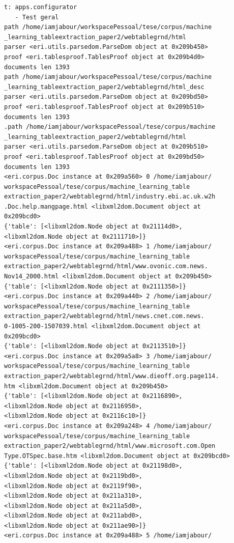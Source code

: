 \documentclass[12pt, a4paper]{article}
\begin{document}
\begin{enumerate}
\begin{verbatim}
t: apps.configurator
   - Test geral
path /home/iamjabour/workspacePessoal/tese/corpus/machine
_learning_tableextraction_paper2/webtablegrnd/html
parser <eri.utils.parsedom.ParseDom object at 0x209b450>
proof <eri.tablesproof.TablesProof object at 0x209b4d0>
documents len 1393
path /home/iamjabour/workspacePessoal/tese/corpus/machine
_learning_tableextraction_paper2/webtablegrnd/html_desc
parser <eri.utils.parsedom.ParseDom object at 0x209bd50>
proof <eri.tablesproof.TablesProof object at 0x209b510>
documents len 1393
.path /home/iamjabour/workspacePessoal/tese/corpus/machine
_learning_tableextraction_paper2/webtablegrnd/html
parser <eri.utils.parsedom.ParseDom object at 0x209b510>
proof <eri.tablesproof.TablesProof object at 0x209bd50>
documents len 1393
<eri.corpus.Doc instance at 0x209a560> 0 /home/iamjabour/
workspacePessoal/tese/corpus/machine_learning_table
extraction_paper2/webtablegrnd/html/industry.ebi.ac.uk.w2h
.Doc.help.mangpage.html <libxml2dom.Document object at 
0x209bcd0>
{'table': [<libxml2dom.Node object at 0x21114d0>, 
<libxml2dom.Node object at 0x2111710>]}
<eri.corpus.Doc instance at 0x209a488> 1 /home/iamjabour/
workspacePessoal/tese/corpus/machine_learning_table
extraction_paper2/webtablegrnd/html/www.ovonic.com.news.
Nov14_2000.html <libxml2dom.Document object at 0x209b450>
{'table': [<libxml2dom.Node object at 0x2111350>]}
<eri.corpus.Doc instance at 0x209a440> 2 /home/iamjabour/
workspacePessoal/tese/corpus/machine_learning_table
extraction_paper2/webtablegrnd/html/news.cnet.com.news.
0-1005-200-1507039.html <libxml2dom.Document object at 
0x209bcd0>
{'table': [<libxml2dom.Node object at 0x2113510>]}
<eri.corpus.Doc instance at 0x209a5a8> 3 /home/iamjabour/
workspacePessoal/tese/corpus/machine_learning_table
extraction_paper2/webtablegrnd/html/www.dieoff.org.page114.
htm <libxml2dom.Document object at 0x209b450>
{'table': [<libxml2dom.Node object at 0x2116890>, 
<libxml2dom.Node object at 0x2116950>, 
<libxml2dom.Node object at 0x2116c10>]}
<eri.corpus.Doc instance at 0x209a248> 4 /home/iamjabour/
workspacePessoal/tese/corpus/machine_learning_table
extraction_paper2/webtablegrnd/html/www.microsoft.com.Open
Type.OTSpec.base.htm <libxml2dom.Document object at 0x209bcd0>
{'table': [<libxml2dom.Node object at 0x21198d0>, 
<libxml2dom.Node object at 0x2119bd0>, 
<libxml2dom.Node object at 0x2119f90>, 
<libxml2dom.Node object at 0x211a310>,
<libxml2dom.Node object at 0x211a5d0>, 
<libxml2dom.Node object at 0x211abd0>, 
<libxml2dom.Node object at 0x211ae90>]} 
<eri.corpus.Doc instance at 0x209a488> 5 /home/iamjabour/

\end{verbatim}
\end{enumerate}
\end{document}
